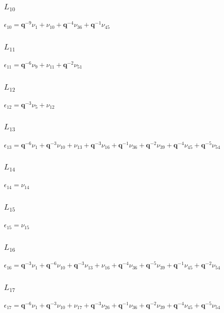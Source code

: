 \subsubsection*{$L_{10}$}
$
\epsilon_{10} = \boldsymbol{q}^{-9}\nu_{1} + \nu_{10} + \boldsymbol{q}^{-4}\nu_{36} + \boldsymbol{q}^{-1}\nu_{45}
$

\subsubsection*{$L_{11}$}
$
\epsilon_{11} = \boldsymbol{q}^{-6}\nu_{9} + \nu_{11} + \boldsymbol{q}^{-2}\nu_{51}
$

\subsubsection*{$L_{12}$}
$
\epsilon_{12} = \boldsymbol{q}^{-3}\nu_{5} + \nu_{12}
$

\subsubsection*{$L_{13}$}
$
\epsilon_{13} = \boldsymbol{q}^{-6}\nu_{1} + \boldsymbol{q}^{-3}\nu_{10} + \nu_{13} + \boldsymbol{q}^{-3}\nu_{16} + \boldsymbol{q}^{-1}\nu_{36} + \boldsymbol{q}^{-2}\nu_{39} + \boldsymbol{q}^{-4}\nu_{45} + \boldsymbol{q}^{-5}\nu_{54}
$

\subsubsection*{$L_{14}$}
$
\epsilon_{14} = \nu_{14}
$

\subsubsection*{$L_{15}$}
$
\epsilon_{15} = \nu_{15}
$

\subsubsection*{$L_{16}$}
$
\epsilon_{16} = \boldsymbol{q}^{-3}\nu_{1} + \boldsymbol{q}^{-6}\nu_{10} + \boldsymbol{q}^{-3}\nu_{13} + \nu_{16} + \boldsymbol{q}^{-4}\nu_{36} + \boldsymbol{q}^{-5}\nu_{39} + \boldsymbol{q}^{-1}\nu_{45} + \boldsymbol{q}^{-2}\nu_{54}
$

\subsubsection*{$L_{17}$}
$
\epsilon_{17} = \boldsymbol{q}^{-6}\nu_{1} + \boldsymbol{q}^{-3}\nu_{10} + \nu_{17} + \boldsymbol{q}^{-3}\nu_{26} + \boldsymbol{q}^{-1}\nu_{36} + \boldsymbol{q}^{-2}\nu_{39} + \boldsymbol{q}^{-4}\nu_{45} + \boldsymbol{q}^{-5}\nu_{54}
$

